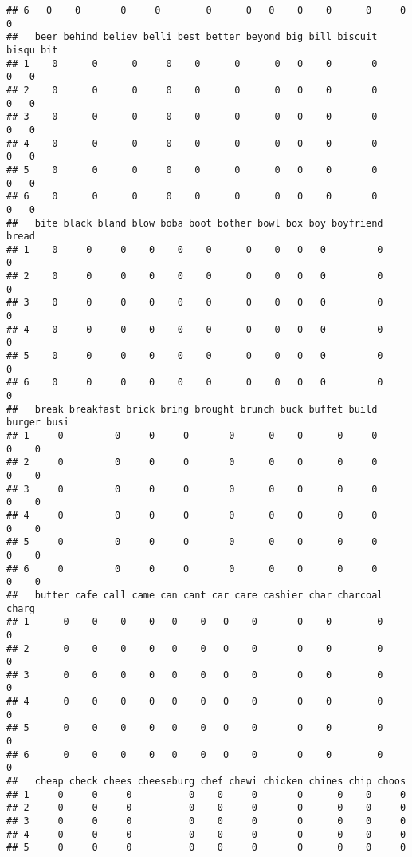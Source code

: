 \documentclass[]{article}
\begin{document}
\begin{verbatim}
## 6   0    0       0     0        0      0   0    0    0      0     0    0
##   beer behind believ belli best better beyond big bill biscuit bisqu bit
## 1    0      0      0     0    0      0      0   0    0       0     0   0
## 2    0      0      0     0    0      0      0   0    0       0     0   0
## 3    0      0      0     0    0      0      0   0    0       0     0   0
## 4    0      0      0     0    0      0      0   0    0       0     0   0
## 5    0      0      0     0    0      0      0   0    0       0     0   0
## 6    0      0      0     0    0      0      0   0    0       0     0   0
##   bite black bland blow boba boot bother bowl box boy boyfriend bread
## 1    0     0     0    0    0    0      0    0   0   0         0     0
## 2    0     0     0    0    0    0      0    0   0   0         0     0
## 3    0     0     0    0    0    0      0    0   0   0         0     0
## 4    0     0     0    0    0    0      0    0   0   0         0     0
## 5    0     0     0    0    0    0      0    0   0   0         0     0
## 6    0     0     0    0    0    0      0    0   0   0         0     0
##   break breakfast brick bring brought brunch buck buffet build burger busi
## 1     0         0     0     0       0      0    0      0     0      0    0
## 2     0         0     0     0       0      0    0      0     0      0    0
## 3     0         0     0     0       0      0    0      0     0      0    0
## 4     0         0     0     0       0      0    0      0     0      0    0
## 5     0         0     0     0       0      0    0      0     0      0    0
## 6     0         0     0     0       0      0    0      0     0      0    0
##   butter cafe call came can cant car care cashier char charcoal charg
## 1      0    0    0    0   0    0   0    0       0    0        0     0
## 2      0    0    0    0   0    0   0    0       0    0        0     0
## 3      0    0    0    0   0    0   0    0       0    0        0     0
## 4      0    0    0    0   0    0   0    0       0    0        0     0
## 5      0    0    0    0   0    0   0    0       0    0        0     0
## 6      0    0    0    0   0    0   0    0       0    0        0     0
##   cheap check chees cheeseburg chef chewi chicken chines chip choos
## 1     0     0     0          0    0     0       0      0    0     0
## 2     0     0     0          0    0     0       0      0    0     0
## 3     0     0     0          0    0     0       0      0    0     0
## 4     0     0     0          0    0     0       0      0    0     0
## 5     0     0     0          0    0     0       0      0    0     0

\end{verbatim}
\end{document}
